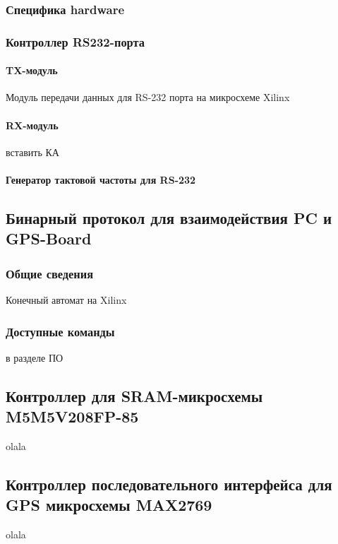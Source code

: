 \subsubsection{Специфика hardware}
\subsubsection{Контроллер RS232-порта}
\paragraph{TX-модуль}
Модуль передачи данных для RS-232 порта на микросхеме Xilinx
\paragraph{RX-модуль}
вставить КА
\paragraph{Генератор тактовой частоты для RS-232}


\subsection{Бинарный протокол для взаимодействия PC и GPS-Board}
\subsubsection{Общие сведения}
Конечный автомат на Xilinx 
\subsubsection{Доступные команды}
в разделе ПО

\subsection{Контроллер для SRAM-микросхемы M5M5V208FP-85}
\label{sec:sram_controller}
olala

\subsection{Контроллер последовательного интерфейса для GPS микросхемы MAX2769}
\label{sec:gps_serial}
olala

\newpage
